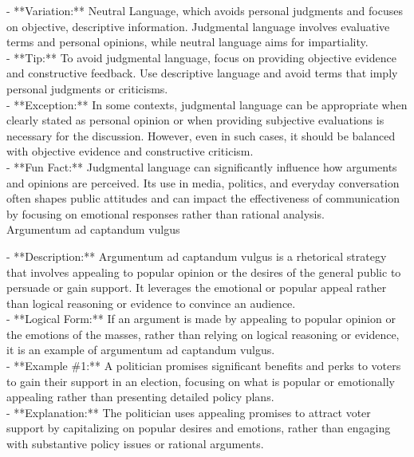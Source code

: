 \documentclass[a4paper,12pt,single,pdftex]{scrbook}
\begin{document}
    
      - **Variation:** Neutral Language, which avoids personal judgments and focuses on objective, descriptive information. Judgmental language involves evaluative terms and personal opinions, while neutral language aims for impartiality.
    \\

    
      - **Tip:** To avoid judgmental language, focus on providing objective evidence and constructive feedback. Use descriptive language and avoid terms that imply personal judgments or criticisms.
    \\

    
      - **Exception:** In some contexts, judgmental language can be appropriate when clearly stated as personal opinion or when providing subjective evaluations is necessary for the discussion. However, even in such cases, it should be balanced with objective evidence and constructive criticism.
    \\

    
      - **Fun Fact:** Judgmental language can significantly influence how arguments and opinions are perceived. Its use in media, politics, and everyday conversation often shapes public attitudes and can impact the effectiveness of communication by focusing on emotional responses rather than rational analysis.
    \\

  

Argumentum ad captandum vulgus
    
      - **Description:** Argumentum ad captandum vulgus is a rhetorical strategy that involves appealing to popular opinion or the desires of the general public to persuade or gain support. It leverages the emotional or popular appeal rather than logical reasoning or evidence to convince an audience.
    \\

    
      - **Logical Form:** If an argument is made by appealing to popular opinion or the emotions of the masses, rather than relying on logical reasoning or evidence, it is an example of argumentum ad captandum vulgus.
    \\

    
      - **Example \#1:** A politician promises significant benefits and perks to voters to gain their support in an election, focusing on what is popular or emotionally appealing rather than presenting detailed policy plans.
    \\

    
      - **Explanation:** The politician uses appealing promises to attract voter support by capitalizing on popular desires and emotions, rather than engaging with substantive policy issues or rational arguments.
    \\
\end{document}
